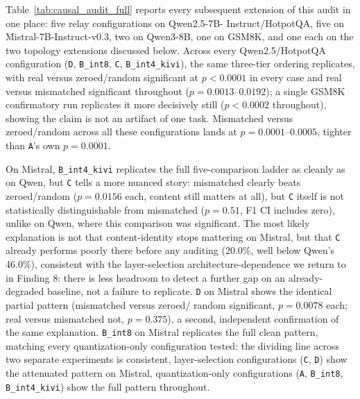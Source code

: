\documentclass[11pt]{article}
\begin{document}
Table~\ref{tab:causal_audit_full} reports every subsequent extension of
this audit in one place: five relay configurations on Qwen2.5-7B-
Instruct/HotpotQA, five on Mistral-7B-Instruct-v0.3, two on Qwen3-8B, one
on GSM8K, and one each on the two topology extensions discussed below.
Across every Qwen2.5/HotpotQA configuration (\texttt{D}, \texttt{B\_int8},
\texttt{C}, \texttt{B\_int4\_kivi}), the same three-tier ordering
replicates, with real versus zeroed/random significant at $p<0.0001$ in
every case and real versus mismatched significant throughout
($p=0.0013$--$0.0192$); a single GSM8K \citep{gsm8k2021} confirmatory run
replicates it more decisively still ($p<0.0002$ throughout), showing the
claim is not an artifact of one task. Mismatched versus zeroed/random
across all these configurations lands at $p=0.0001$--$0.0005$, tighter
than \texttt{A}'s own $p=0.0001$.



On Mistral, \texttt{B\_int4\_kivi} replicates the full five-comparison
ladder as cleanly as on Qwen, but \texttt{C} tells a more nuanced story:
mismatched clearly beats zeroed/random ($p=0.0156$ each, content still
matters at all), but \texttt{C} itself is not statistically distinguishable
from mismatched ($p=0.51$, F1 CI includes zero), unlike on Qwen, where
this comparison was significant. The most likely explanation is not that
content-identity stops mattering on Mistral, but that \texttt{C} already
performs poorly there before any auditing (20.0\%, well below Qwen's
46.0\%), consistent with the layer-selection architecture-dependence we
return to in Finding 8: there is less headroom to detect a further gap on
an already-degraded baseline, not a failure to replicate. \texttt{D} on
Mistral shows the identical partial pattern (mismatched versus zeroed/
random significant, $p=0.0078$ each; real versus mismatched not,
$p=0.375$), a second, independent confirmation of the same explanation.
\texttt{B\_int8} on Mistral replicates the full clean pattern, matching
every quantization-only configuration tested: the dividing line across
two separate experiments is consistent, layer-selection configurations
(\texttt{C}, \texttt{D}) show the attenuated pattern on Mistral,
quantization-only configurations (\texttt{A}, \texttt{B\_int8},
\texttt{B\_int4\_kivi}) show the full pattern throughout.
\end{document}
